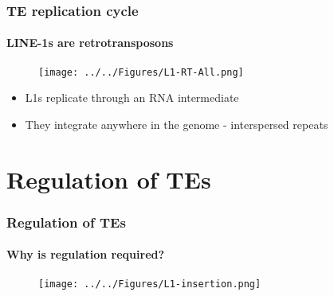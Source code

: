 \documentclass{beamer}
\begin{document}
		\begin{frame} %
			
			\frametitle{TE replication cycle}
			\framesubtitle{LINE-1s are retrotransposons}
			
			\begin{figure}
				\texttt{[image: ../../Figures/L1-RT-All.png]}
			\end{figure}
			\begin{itemize}
				\item L1s replicate through an RNA intermediate
				\item They integrate anywhere in the genome - interspersed repeats
			\end{itemize}
			
		\end{frame}
			
			\section[Regulation of TEs]{Regulation of TEs}
	
		\begin{frame} %
			\frametitle{Regulation of TEs}
			\framesubtitle{Why is regulation required?}
			
					
%						
%						
					
						
						\begin{figure}
							\texttt{[image: ../../Figures/L1-insertion.png]}
						\end{figure}	
						
%					
				
				
		\end{frame}		
	
\end{document}

